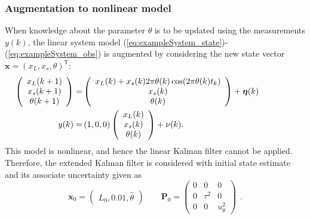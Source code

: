\documentclass[10pt]{article}
\begin{document}
\begin{spacing}{1}
\subsubsection*{Augmentation to nonlinear model}
When knowledge about the parameter $\theta$ is to be updated using the measurements $y(k)$, the linear system model (\ref{eq:exampleSystem_state})-(\ref{eq:exampleSystem_obs}) is augmented by considering the new state vector $\bm{x}=\left( x_L, x_s, \theta \right)^{\mathsf{T}}$:
\begin{align}
\hspace{-10ex}	\left( \begin{array}{c}
x_L(k+1) \\ x_s(k+1) \\ \theta(k+1)
\end{array}\right)
 =& 
\left(\begin{array}{c}
x_L(k)+ x_s(k)2\pi\theta(k) \cos(2\pi\theta(k) t_k) \\ x_s(k) \\ \theta(k)
\end{array}\right)
+
\bm{\eta}(k) \\
\hspace{-10ex}y(k) =& \left( 1, 0, 0\right) \left( \begin{array}{c}
x_L(k) \\ x_s(k) \\ \theta(k)
\end{array}\right)
+ \nu(k) .
\end{align}
This model is nonlinear, and hence the linear Kalman filter cannot be applied. Therefore, the extended Kalman filter is considered
with initial state estimate and its associate uncertainty given as
\begin{equation}
	\bm{x}_0 = \left( \begin{array}{c}
L_0, 0.01, \hat{\theta} 
\end{array}\right)
\qquad
\bm{P}_0 = \left(\begin{array}{ccc}
0 & 0 & 0 \\
0 & \tau^2 & 0 \\
0 & 0 & u_\theta^2
\end{array}\right) ~~.
\end{equation}


\end{spacing}
\end{document}
